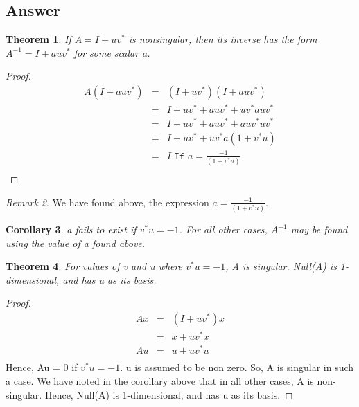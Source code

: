 \documentclass[10pt]{amsart}
\newtheorem{thm}{Theorem}[subsection]
\newtheorem{cor}[thm]{Corollary}
\theoremstyle{remark}
\newtheorem{rem}[thm]{Remark}
\begin{document}
\subsection{Answer}
\begin{thm}
If $A=I+uv^{*}$ is nonsingular, then its inverse has the form $A^{-1} = I + auv^{*}$ for some scalar a.
\end{thm}
\begin{proof}
\begin{eqnarray}
A(I+auv^{*}) &=& (I+uv^{*})(I+auv^{*})\\
&=& I + uv^{*} + auv^{*} + uv^{*}auv^{*}\\
&=& I + uv^{*} + auv^{*} + auv^{*}uv^{*}\\
&=& I + uv^{*} + uv^{*} a(1 + v^{*}u)\\
&=& I \texttt{ If $a = \frac{-1}{(1 + v^{*}u)}$}\\
\end{eqnarray}
\end{proof}

\begin{rem}
We have found above, the expression $a = \frac{-1}{(1 + v^{*}u)}$.
\end{rem}

\begin{cor}
a fails to exist if $v^{*}u = -1$. For all other cases, $A^{-1}$ may be found using the value of a found above.
\end{cor}

\begin{thm}
For values of v and u where $v^{*}u = -1$, A is singular. Null(A) is 1-dimensional, and has u as its basis.
\end{thm}
\begin{proof}
\begin{eqnarray}
Ax &=& (I+uv^{*})x \\
&=& x+ uv^{*}x \\
Au &=& u+ uv^{*}u \\
\end{eqnarray}
Hence, Au = 0 if $v^{*}u = -1$. u is assumed to be non zero. So, A is singular in such a case. We have noted in the corollary above that in all other cases, A is non-singular. Hence, Null(A) is 1-dimensional, and has u as its basis.
\end{proof}

% 
% 
\end{document}

